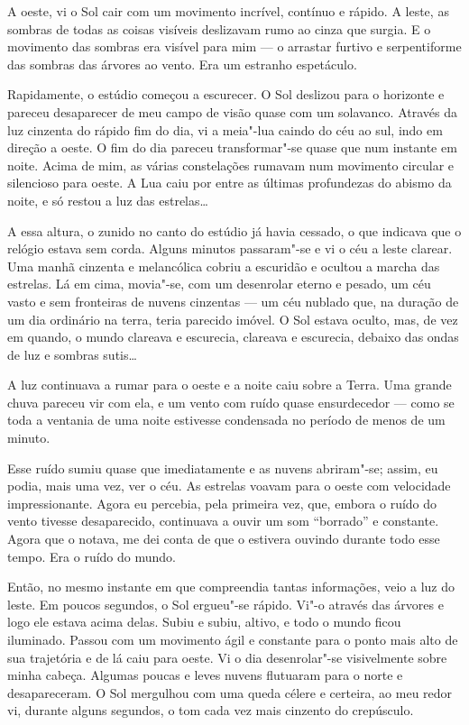 A oeste, vi o Sol cair com um movimento incrível, contínuo e rápido. A leste, as sombras de todas as coisas visíveis
deslizavam rumo ao cinza que surgia. E o movimento das sombras era visível para mim --- o arrastar furtivo e
serpentiforme das sombras das árvores ao vento. Era um estranho espetáculo.

Rapidamente, o estúdio começou a escurecer. O Sol deslizou para o horizonte e pareceu desaparecer de meu campo de visão
quase com um solavanco. Através da luz cinzenta do rápido fim do dia, vi a meia"-lua caindo do céu ao sul, indo em
direção a oeste. O fim do dia pareceu transformar"-se quase que num instante em noite. Acima de mim, as várias
constelações rumavam num movimento circular e silencioso para oeste. A Lua caiu por entre as últimas profundezas do
abismo da noite, e só restou a luz das estrelas\ldots{}

A essa altura, o zunido no canto do estúdio já havia cessado, o que indicava que o relógio estava sem corda. Alguns
minutos passaram"-se e vi o céu a leste clarear. Uma manhã cinzenta e melancólica cobriu a escuridão e ocultou a marcha
das estrelas. Lá em cima, movia"-se, com um desenrolar eterno e pesado, um céu vasto e sem fronteiras de nuvens
cinzentas --- um céu nublado que, na duração de um dia ordinário na terra, teria parecido imóvel. O Sol estava oculto,
mas, de vez em quando, o mundo clareava e escurecia, clareava e escurecia, debaixo das ondas de luz e sombras sutis\ldots{}

A luz continuava a rumar para o oeste e a noite caiu sobre a Terra. Uma grande chuva pareceu vir com ela, e um vento
com ruído quase ensurdecedor --- como se toda a ventania de uma noite estivesse condensada no período de menos de um
minuto.

Esse ruído sumiu quase que imediatamente e as nuvens abriram"-se; assim, eu podia, mais uma vez, ver o céu. As estrelas
voavam para o oeste com velocidade impressionante. Agora eu percebia, pela primeira vez, que, embora o ruído do vento
tivesse desaparecido, continuava a ouvir um som “borrado” e constante. Agora que o notava, me dei conta de que o estivera
ouvindo durante todo esse tempo. Era o ruído do mundo.

Então, no mesmo instante em que compreendia tantas informações, veio a luz do leste. Em poucos segundos, o Sol
ergueu"-se rápido. Vi"-o através das árvores e logo ele estava acima delas. Subiu e subiu, altivo, e todo o mundo
ficou iluminado. Passou com um movimento ágil e constante para o ponto mais alto de sua trajetória e de lá caiu para
oeste. Vi o dia desenrolar"-se visivelmente sobre minha cabeça. Algumas poucas e leves nuvens flutuaram para o norte e
desapareceram. O Sol mergulhou com uma queda célere e certeira, ao meu redor vi, durante alguns segundos, o tom cada
vez mais cinzento do crepúsculo.

